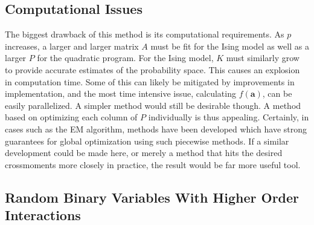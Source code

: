 \documentclass[11pt]{article}
\theoremstyle{definition}
\begin{document}
\subsection{Computational Issues}
    The biggest drawback of this method is its computational requirements. As $p$ increases, a larger and larger matrix $A$ must be fit for the Ising model as well as a larger $P$ for the quadratic program. For the Ising model, $K$ must similarly grow to provide accurate estimates of the probability space. This causes an explosion in computation time. Some of this can likely be mitigated by improvements in implementation, and the most time intensive issue, calculating $f(\mathbf a)$, can be easily parallelized. A simpler method would still be desirable though. A method based on optimizing each column of $P$ individually is thus appealing. Certainly, in cases such as the EM algorithm, methods have been developed which have strong guarantees for global optimization using such piecewise methods. If a similar development could be made here, or merely a method that hits the desired crossmoments more closely in practice, the result would be far more useful tool.

\subsection{Random Binary Variables With Higher Order Interactions}
    
    
    

 

    
\end{document}
